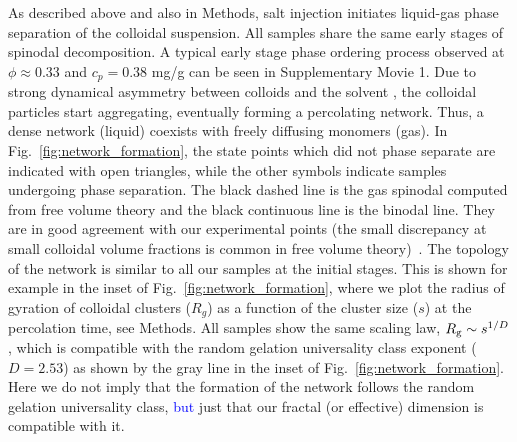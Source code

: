 \documentclass[preprint,amsmath,amssymb,superscriptaddress]{revtex4-1}
\begin{document}
As described above and also in Methods, salt injection initiates liquid-gas phase separation of the colloidal suspension. 
All samples share the same early stages of spinodal decomposition. 
A typical early stage phase ordering process observed at $\phi\approx 0.33$ and $c_p=0.38$ mg/g can be seen in Supplementary Movie 1.
Due to strong dynamical asymmetry between colloids and the solvent \cite{tanaka1999colloid}, the colloidal particles start aggregating, 
eventually forming a percolating network. Thus, a dense network (liquid) coexists with freely diffusing monomers (gas).
In Fig.~\ref{fig:network_formation}, the state points which did not phase separate are indicated with open triangles, while
the other symbols indicate samples undergoing phase separation. The black dashed line is the gas spinodal computed from free volume theory and the 
black continuous line is the binodal line. They are in good agreement with our experimental points (the small discrepancy at small colloidal volume fractions 
is common in free volume theory)~\cite{Royall2007,lu2008gelation}.
The topology of the network is similar to all our samples at the initial stages. 
This is shown for example in the inset of Fig.~\ref{fig:network_formation}, where we plot the radius of gyration of colloidal clusters ($R_g$)
as a function of the cluster size ($s$) at the percolation time, see Methods. All samples show the same scaling law, $R_{\rm g}\sim s^{1/D}$, which is compatible with
the random gelation universality class exponent ($D=2.53$) as shown by the gray line in the inset of Fig.~\ref{fig:network_formation}. Here we do not imply that the formation of the network follows the random gelation universality class, \textcolor{blue}{but} just that our
fractal (or effective) dimension is compatible with it.

\end{document}
